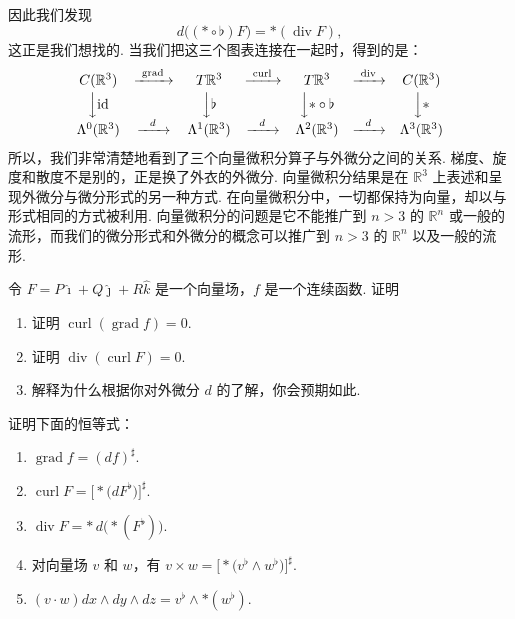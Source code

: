 因此我们发现
\[
d\bigl((\ast\circ\flat)F\bigr)=\ast(\operatorname{div}F),
\]
这正是我们想找的. 当我们把这三个图表连接在一起时，得到的是：
\[
\begin{array}{ccccccccc}
C(\mathbb{R}^3)&\xrightarrow{\ \operatorname{grad}\ }&T\mathbb{R}^3&\xrightarrow{\ \operatorname{curl}\ }&T\mathbb{R}^3&\xrightarrow{\ \operatorname{div}\ }&C(\mathbb{R}^3)\\[2pt]
\Big\downarrow \mathrm{id}&&\Big\downarrow \flat&&\Big\downarrow {\ast\circ\flat}&&\Big\downarrow \ast\\[2pt]
\Lambda^0(\mathbb{R}^3)&\xrightarrow{\ \ d\ \ }&\Lambda^1(\mathbb{R}^3)&\xrightarrow{\ \ d\ \ }&\Lambda^2(\mathbb{R}^3)&\xrightarrow{\ \ d\ \ }&\Lambda^3(\mathbb{R}^3)
\end{array}
\]
所以，我们非常清楚地看到了三个向量微积分算子与外微分之间的关系. 梯度、旋度和散度不是别的，正是换了外衣的外微分. 向量微积分结果是在 $\mathbb{R}^3$ 上表述和呈现外微分与微分形式的另一种方式. 在向量微积分中，一切都保持为向量，却以与形式相同的方式被利用. 向量微积分的问题是它不能推广到 $n>3$ 的 $\mathbb{R}^n$ 或一般的流形，而我们的微分形式和外微分的概念可以推广到 $n>3$ 的 $\mathbb{R}^n$ 以及一般的流形.

\begin{question}\label{q:9-10}
令 $F=P\hat{\imath}+Q\hat{\jmath}+R\hat{k}$ 是一个向量场，$f$ 是一个连续函数. 证明
\begin{enumerate}
  \item[(a)] 证明 $\operatorname{curl}(\operatorname{grad}f)=0$.
  \item[(b)] 证明 $\operatorname{div}(\operatorname{curl}F)=0$.
  \item[(c)] 解释为什么根据你对外微分 $d$ 的了解，你会预期如此.
\end{enumerate}
\end{question}

\begin{question}\label{q:9-11}
证明下面的恒等式：
\begin{enumerate}
  \item[(a)] $\operatorname{grad}f=(df)^{\sharp}$.
  \item[(b)] $\operatorname{curl}F=\bigl[\ast\bigl(dF^{\flat}\bigr)\bigr]^{\sharp}$.
  \item[(c)] $\operatorname{div}F=\ast\,d\bigl(\ast(F^{\flat})\bigr)$.
  \item[(d)] 对向量场 $v$ 和 $w$，有 $v\times w=\bigl[\ast\bigl(v^{\flat}\wedge w^{\flat}\bigr)\bigr]^{\sharp}$.
  \item[(e)] $(v\cdot w)dx\wedge dy\wedge dz=v^{\flat}\wedge\ast(w^{\flat})$.
\end{enumerate}
\end{question}

